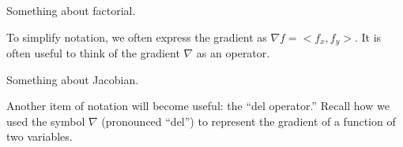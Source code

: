 \documentclass{book}
\begin{document}

%

%

Something about factorial.

\clearpage

To simplify notation, we often express the gradient as $\nabla f =<f_x, f_y>$. It is often useful to think of the gradient $\nabla$ as an operator.

\clearpage

Something about Jacobian.

\clearpage

Another item of notation will become useful: the ``del operator.'' Recall how we used the symbol $\nabla$ (pronounced ``del'') to represent the gradient of a function of two variables.

%

%
%

{}
%
\printindex

%
%
\end{document}
